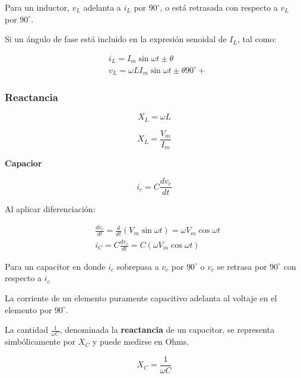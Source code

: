 Para un inductor, $v_{L}$ adelanta a $i_{L}$ por $90^{\circ}$, o está retrasada con respecto a $v_{L}$
por $90^{\circ}$.

Si un ángulo de fase está incluido en la expresión senoidal de $I_{L}$, tal como:

\begin{align*}
	 & i_{L}=I_{m}\sin{\omega t \pm \theta}                      \\
	 & v_{L}=\omega LI_{m}\sin{\omega t \pm  \theta 90^{\circ}+}
\end{align*}

\subsubsection{Reactancia}

\begin{equation}
	X_{L}=\omega L
\end{equation}

\begin{equation}
	X_{L}=\frac{V_{m}}{I_{m}}
\end{equation}

\textbf{Capacior}

\begin{equation}
	i_{c}=C \frac{dv_{c}}{dt}
\end{equation}

Al aplicar diferenciación:

\begin{align*}
	 & \frac{dv_{c}}{dt}=\frac{d}{dt}\left( V_{m}\sin{\omega t} \right)=\omega V_{m}\cos{\omega t} \\
	 & i_{C}=C\frac{dv_{c}}{dt}=C\left( \omega V_{m}\cos{\omega t} \right)
\end{align*}


Para un capacitor en donde $i_{c}$ sobrepasa a $v_{c}$ por $90^{\circ}$ o $v_{c}$ se retrasa
por $90^{\circ}$ con respecto a $i_{c}$

La corriente de un elemento puramente capacitivo adelanta al voltaje en el elemento por $90^{\circ}$.

La cantidad $\frac{1}{\omega C}$, denominada la \textbf{reactancia} de un capacitor, se representa simbólicamente por $X_{C}$ y puede medirse en Ohms.


\begin{equation}
	X_{C}=\frac{1}{\omega C}
\end{equation}

